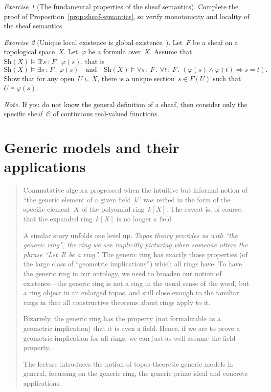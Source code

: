 \documentclass[10pt,reqno,a4paper,openany]{amsbook}
\theoremstyle{definition}
\theoremstyle{plain}
\theoremstyle{remark}
\newcommand{\CCC}{\mathcal{C}}
\newcommand{\?}{\,{:}\,}
\renewcommand{\_}{\mathpunct{.}\,}
\newenvironment{intro}{\begin{quote}}{\end{quote}\bigskip\noindent}
\newtheorem{exercise}{Exercise}[chapter]
\newcommand{\Sh}{\mathrm{Sh}}
\begin{document}
\begin{exercise}[The fundamental properties of the sheaf semantics]
Complete the proof of Proposition~\ref{prop:sheaf-semantics}, so verify
monotonicity and locality of the sheaf semantics.
\end{exercise}

\begin{exercise}[{Unique local existence is global existence~\cite[Exercise~27]{blechschmidt:generalized-spaces}}]
Let~$F$ be a sheaf on a topological space~$X$. Let~$\varphi$ be a formula over~$X$. Assume
that~$\Sh(X) \models \exists!s\?F\_ \varphi(s)$, that is
\[ \Sh(X) \models \exists s\?F\_ \varphi(s) \quad\text{and}\quad
  \Sh(X) \models \forall s\?F\_ \forall t\?F\_ (\varphi(s) \wedge \varphi(t)
  \Rightarrow s = t). \]
Show that for any open~$U \subseteq X$, there is a unique section~$s \in F(U)$
such that~$U \models \varphi(s)$.

{\noindent\scriptsize\emph{Note.} If you do not know the general definition of
a sheaf, then consider only the specific sheaf~$\CCC$ of continuous real-valued
functions.\par}
\end{exercise}


\chapter{Generic models and their applications}
\label{lect:generic}

\begin{intro}
Commutative algebra progressed when the intuitive but informal notion of
``the generic element of a given field~$k$'' was reified in the form of the
specific element~$X$ of the polyomial ring~$k[X]$. The caveat is, of course,
that the expanded ring~$k[X]$ is no longer a field.

A similar story unfolds one level up. \emph{Topos theory provides us with ``the
generic ring'', the ring we are implicitly picturing when someone utters
the phrase ``Let~$R$ be a ring''.} The generic ring has exactly those
properties (of the large class of ``geometric implications'') which all rings
have. To have the generic ring in our ontology,
we need to broaden our notion of existence---the generic ring is not a
ring in the usual sense of the word, but a ring object in an enlarged
topos, and still close enough to the familiar rings in that all
constructive theorems about rings apply to it.

Bizarrely, the generic ring has the property (not formalizable as a
geometric implication) that it is even a field. Hence, if we are to
prove a geometric implication for all rings, we can just as well assume
the field property.

The lecture introduces the notion of topos-theoretic generic models in
general, focussing on the generic ring, the generic prime ideal and
concrete applications.
\end{intro}
\end{document}
